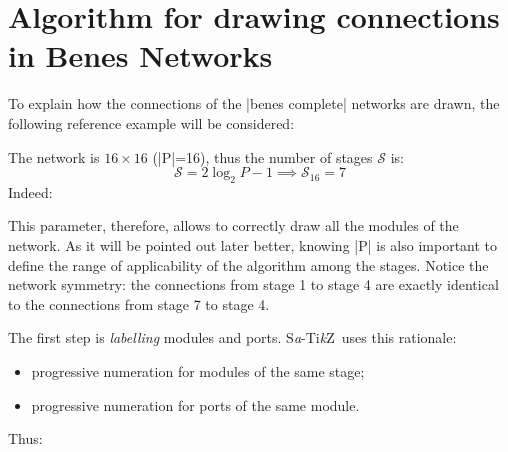 \documentclass{ltxdoc}
\newcommand\Tikz{Ti\textit kZ}
\newcommand{\saTikZ}{S\textit{a}-\Tikz}
\begin{document}
\section{Algorithm for drawing connections in Benes Networks}
\label{sec:benesconnalg}
To explain how the connections of the |benes complete| networks are drawn, the following reference example will be considered:
\begin{center}
\scalebox{0.75}{
	\begin{tikzpicture}[module size=0.75cm, module ysep=1, module xsep=2.5]
		\node[P=16, benes complete]{};
	\end{tikzpicture}
}
\end{center}
The network is $16\times 16$ (|P|=16), thus the number of stages $\mathcal{S}$ is:
\[\mathcal{S}=2\log_2{P}-1 \implies \mathcal{S}_{16}=7\]
Indeed:
\begin{center}
\end{center}
This parameter, therefore, allows to correctly draw all the modules of the network. As it will be pointed out later better, knowing |P| is also important to define the range of applicability of the algorithm among the stages. Notice the network symmetry: the connections from stage 1 to stage 4 are exactly identical to the connections from stage 7 to stage 4.  
\pagebreak

The first step is \emph{labelling} modules and ports. \saTikZ\ uses this rationale:
\begin{itemize}
\item progressive numeration for modules of the same stage;
\item progressive numeration for ports of the same module.
\end{itemize}

Thus:
\begin{center}
\end{center}
\end{document}
